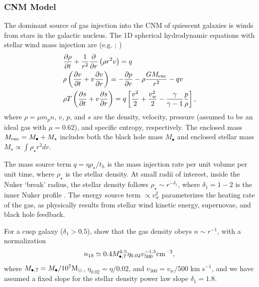 \documentclass[usenatbib,fleqn]{mnras}
\newcommand{\Mbh}[1][]{M_{\bullet#1}}
\newcommand{\Menc}{M_{\rm enc}}
\renewcommand{\th}{t_h}
\newcommand{\Msun}{{\rm M_\odot}}
\begin{document}
\subsubsection{CNM Model}
\label{sec:model}

The dominant source of gas injection into the CNM of quiescent
galaxies is winds from stars in the galactic nucleus. The 1D spherical
hydrodynamic equations with stellar wind mass injection are
(e.g. \citealt{Holzer+1970}; \citealt{Quataert2004}) 
\begin{align}
  &\frac{\partial \rho}{\partial t}+\frac{1}{r^2}\frac{\partial}{\partial r}\left(\rho r^2 v\right)=q \label{eq:drhodt}\\
  &\rho \left(\frac{\partial v}{\partial t} + v\frac{\partial
      v}{\partial r}\right) =-\frac{\partial p}{\partial r}- \rho\frac{GM_{\rm enc}}{r^{2}} -q v \label{eq:dvdt}\\
  &\rho T\left(\frac{\partial s}{\partial t} + v\frac{\partial
      s}{\partial
      r}\right)=q\left[\frac{v^2}{2}+\frac{v_w^2}{2}-\frac{\gamma}{\gamma-1}
    \frac{p}{\rho} \right] ,
\label{eq:dsdt}
\end{align}
where $\rho = \mu m_p n$, $v$, $p$, and $s$ are the density, velocity,
pressure (assumed to be an ideal gas with $\mu = 0.62$), and specific
entropy, respectively.  The enclosed mass $\Menc = M_{\bullet} +
M_{\star}$ includes both the black hole mass $M_{\bullet}$ and
enclosed stellar mass $M_{\star} \propto \int \rho_{\star}r^{2}dr$.

The mass source term $q =\eta \rho_\star/\th$ is the mass injection
rate per unit volume per unit time, where $\rho_\star$ is the stellar
density.  At small radii of interest, inside the Nuker `break' radius,
the stellar density follows $\rho_\star\sim r^{-\delta_1}$, where
$\delta_1 = 1-2$ is the inner Nuker profile \citep{Lauer+2007}.  The
energy source term $\propto v_w^{2}$ parameterizes the heating rate of
the gas, as physically results from stellar wind kinetic energy,
supernovae, and black hole feedback.

For a cusp galaxy ($\delta_1> 0.5$), \citet{Generozov+2015} show that the gas density obeys $n \sim
r^{-1}$, with a normalization
\begin{equation}
n_{18}\simeq 0.4 \Mbh[,7]^{0.5} \eta_{0.02} v_{500}^{-1.5} {\rm
  cm^{-3}},
\label{eq:n18}
\end{equation}
where $\Mbh[,7]= \Mbh/10^7 \Msun$,
$\eta_{0.02}= \eta/0.02$, and $v_{500}=v_w/500$ km s$^{-1}$, and we have assumed a fixed slope for the stellar density
power law slope $\delta_1=1.8$. 
\end{document}
